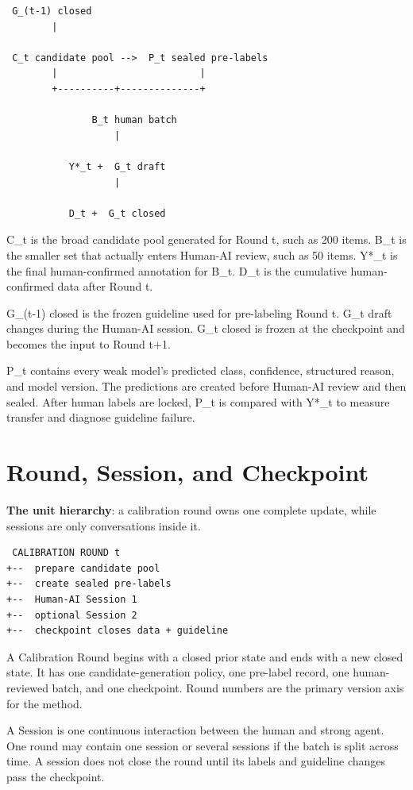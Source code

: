 \begin{verbatim}
 G_(t-1) closed
        |

 C_t candidate pool -->  P_t sealed pre-labels
        |                         |
        +----------+--------------+

               B_t human batch
                   |

           Y*_t +  G_t draft
                   |

           D_t +  G_t closed
\end{verbatim}
C_t is the broad candidate pool generated for Round t, such as 200 items. B_t is the smaller set that actually enters Human-AI review, such as 50 items. Y*_t is the final human-confirmed annotation for B_t. D_t is the cumulative human-confirmed data after Round t.

G_(t-1) closed is the frozen guideline used for pre-labeling Round t. G_t draft changes during the Human-AI session. G_t closed is frozen at the checkpoint and becomes the input to Round t+1.

P_t contains every weak model's predicted class, confidence, structured reason, and model version. The predictions are created before Human-AI review and then sealed. After human labels are locked, P_t is compared with Y*_t to measure transfer and diagnose guideline failure.


\section{Round, Session, and Checkpoint}
\textbf{The unit hierarchy}: a calibration round owns one complete update, while sessions are only conversations inside it.

\begin{verbatim}
 CALIBRATION ROUND t
+--  prepare candidate pool
+--  create sealed pre-labels
+--  Human-AI Session 1
+--  optional Session 2
+--  checkpoint closes data + guideline
\end{verbatim}
A Calibration Round begins with a closed prior state and ends with a new closed state. It has one candidate-generation policy, one pre-label record, one human-reviewed batch, and one checkpoint. Round numbers are the primary version axis for the method.

A Session is one continuous interaction between the human and strong agent. One round may contain one session or several sessions if the batch is split across time. A session does not close the round until its labels and guideline changes pass the checkpoint.

